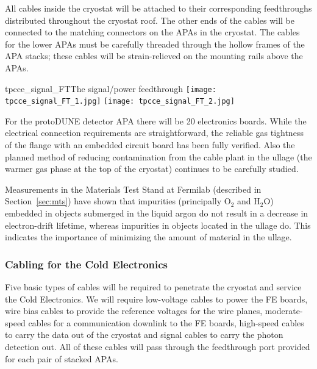 All cables inside the cryostat will be attached to their corresponding feedthroughs distributed throughout the cryostat roof.
The other ends of the cables will be connected to the matching connectors on the APAs in the cryostat.
The cables for the lower APAs must be carefully threaded through the hollow frames of the APA stacks;
these cables will be strain-relieved on the mounting rails above the APAs. 


\begin{cdrfigure}{tpcce_signal_FT}{The signal/power feedthrough}
\texttt{[image: tpcce\_signal\_FT\_1.jpg]}
\texttt{[image: tpcce\_signal\_FT\_2.jpg]}
\end{cdrfigure}

For the protoDUNE detector APA there will be 20 electronics boards.
While the electrical connection requirements are straightforward,
the reliable gas tightness of the flange with an embedded circuit board has been fully verified.
Also the planned method of reducing contamination from the cable plant in the ullage
(the warmer gas phase at the top of the cryostat) 
continues to be carefully studied.

Measurements in the Materials Test Stand at Fermilab (described in Section~\ref{sec:mts})
have shown that impurities (principally O$_2$ and H$_2$O) embedded in objects submerged in the liquid argon do not result
in a decrease in electron-drift lifetime, whereas impurities in objects located in the ullage do.
This indicates the importance of minimizing the amount of material in the ullage.

%
\subsubsection{Cabling for the Cold Electronics }
\label{subsubsec:ce_feedthrough_cable}

Five basic types of cables will be required to penetrate the cryostat and service the Cold Electronics.
We will require low-voltage cables to power the FE boards,
wire bias cables to provide the reference voltages for the wire planes,
moderate-speed cables for a communication downlink to the FE boards,
high-speed cables to carry the data out of the cryostat and signal cables to carry the photon detection out.
All of these cables will pass through the feedthrough port provided for each pair of stacked APAs.

